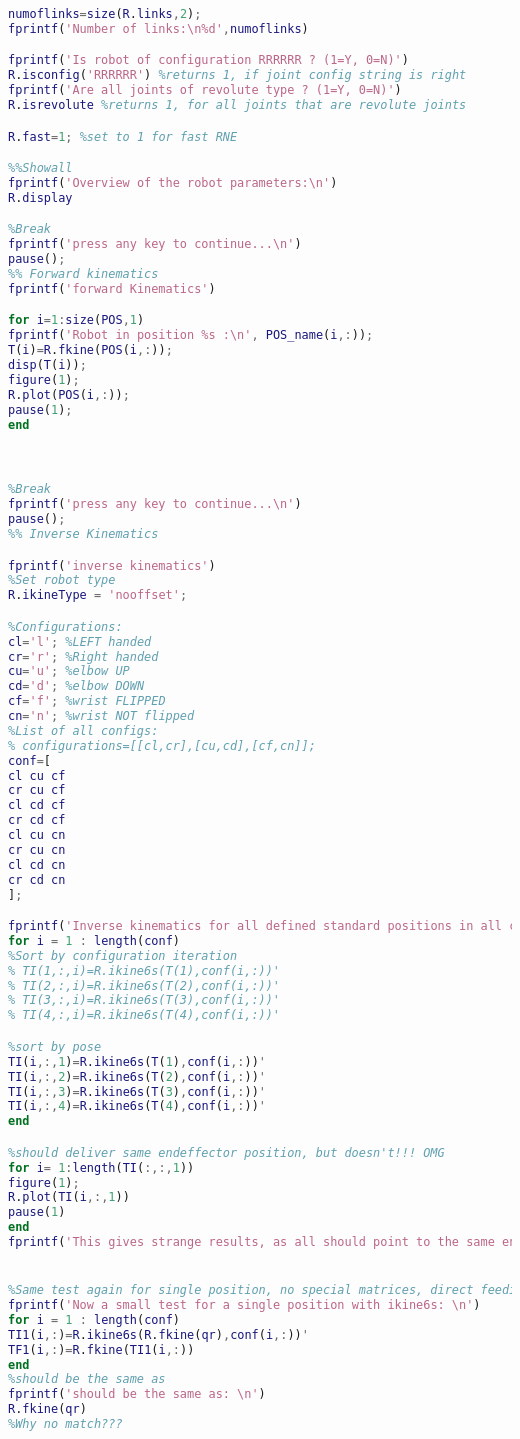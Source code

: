 \begin{lstlisting}[language=Matlab]
numoflinks=size(R.links,2);
fprintf('Number of links:\n%d',numoflinks)

fprintf('Is robot of configuration RRRRRR ? (1=Y, 0=N)')
R.isconfig('RRRRRR') %returns 1, if joint config string is right
fprintf('Are all joints of revolute type ? (1=Y, 0=N)')
R.isrevolute %returns 1, for all joints that are revolute joints

R.fast=1; %set to 1 for fast RNE

%%Showall
fprintf('Overview of the robot parameters:\n')
R.display

%Break 
fprintf('press any key to continue...\n')
pause();
%% Forward kinematics
fprintf('forward Kinematics')

for i=1:size(POS,1)
fprintf('Robot in position %s :\n', POS_name(i,:));
T(i)=R.fkine(POS(i,:));
disp(T(i));
figure(1);
R.plot(POS(i,:));
pause(1);
end



%Break 
fprintf('press any key to continue...\n')
pause();
%% Inverse Kinematics

fprintf('inverse kinematics')
%Set robot type
R.ikineType = 'nooffset';

%Configurations: 
cl='l'; %LEFT handed
cr='r'; %Right handed
cu='u'; %elbow UP
cd='d'; %elbow DOWN
cf='f'; %wrist FLIPPED
cn='n'; %wrist NOT flipped
%List of all configs:
% configurations=[[cl,cr],[cu,cd],[cf,cn]];
conf=[
cl cu cf
cr cu cf
cl cd cf
cr cd cf
cl cu cn
cr cu cn
cl cd cn
cr cd cn
];

fprintf('Inverse kinematics for all defined standard positions in all configurations: \n')
for i = 1 : length(conf)  
%Sort by configuration iteration
% TI(1,:,i)=R.ikine6s(T(1),conf(i,:))'
% TI(2,:,i)=R.ikine6s(T(2),conf(i,:))'
% TI(3,:,i)=R.ikine6s(T(3),conf(i,:))'
% TI(4,:,i)=R.ikine6s(T(4),conf(i,:))'

%sort by pose
TI(i,:,1)=R.ikine6s(T(1),conf(i,:))'
TI(i,:,2)=R.ikine6s(T(2),conf(i,:))'
TI(i,:,3)=R.ikine6s(T(3),conf(i,:))'
TI(i,:,4)=R.ikine6s(T(4),conf(i,:))'
end

%should deliver same endeffector position, but doesn't!!! OMG
for i= 1:length(TI(:,:,1))
figure(1);
R.plot(TI(i,:,1))
pause(1)
end
fprintf('This gives strange results, as all should point to the same endeffector position... \n \n')


%Same test again for single position, no special matrices, direct feeding
fprintf('Now a small test for a single position with ikine6s: \n')
for i = 1 : length(conf)
TI1(i,:)=R.ikine6s(R.fkine(qr),conf(i,:))'
TF1(i,:)=R.fkine(TI1(i,:))
end
%should be the same as
fprintf('should be the same as: \n')
R.fkine(qr)
%Why no match???


\end{lstlisting}

